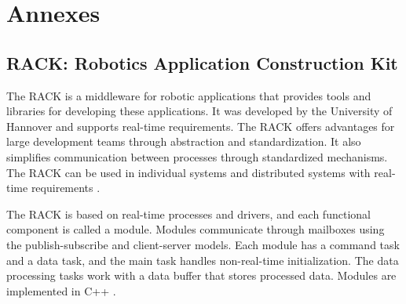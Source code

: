 \chapter* {Annexes}
\section*{RACK: Robotics Application Construction Kit}

The RACK is a middleware for robotic applications that provides tools and libraries for developing these 
applications. It was developed by the University of Hannover and supports real-time requirements. The RACK 
offers advantages for large development teams through abstraction and standardization. It also simplifies 
communication between processes through standardized mechanisms. The RACK can be used in individual systems 
and distributed systems with real-time requirements \cite{R28}.

The RACK is based on real-time processes and drivers, and each functional component is called a module. 
Modules communicate through mailboxes using the publish-subscribe and client-server models. Each module 
has a command task and a data task, and the main task handles non-real-time initialization. The data 
processing tasks work with a data buffer that stores processed data. Modules are implemented in C++ \cite{R28}.

